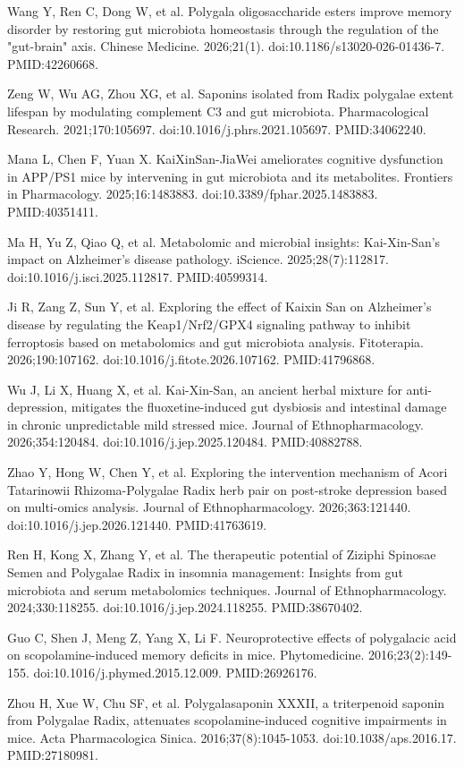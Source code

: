 \documentclass[11pt,oneside]{book}
\newcommand{\reff}[2]{\par\hangindent=7mm\hangafter=1\noindent[#1]\hspace{2mm}#2\par}
\begin{document}
\reff{22}{Wang Y, Ren C, Dong W, et al. Polygala oligosaccharide esters improve memory disorder by restoring gut microbiota homeostasis through the regulation of the "gut-brain" axis. Chinese Medicine. 2026;21(1). doi:10.1186/s13020-026-01436-7. PMID:42260668.}
\reff{23}{Zeng W, Wu AG, Zhou XG, et al. Saponins isolated from Radix polygalae extent lifespan by modulating complement C3 and gut microbiota. Pharmacological Research. 2021;170:105697. doi:10.1016/j.phrs.2021.105697. PMID:34062240.}
\reff{24}{Mana L, Chen F, Yuan X. KaiXinSan-JiaWei ameliorates cognitive dysfunction in APP/PS1 mice by intervening in gut microbiota and its metabolites. Frontiers in Pharmacology. 2025;16:1483883. doi:10.3389/fphar.2025.1483883. PMID:40351411.}
\reff{25}{Ma H, Yu Z, Qiao Q, et al. Metabolomic and microbial insights: Kai-Xin-San's impact on Alzheimer's disease pathology. iScience. 2025;28(7):112817. doi:10.1016/j.isci.2025.112817. PMID:40599314.}
\reff{26}{Ji R, Zang Z, Sun Y, et al. Exploring the effect of Kaixin San on Alzheimer's disease by regulating the Keap1/Nrf2/GPX4 signaling pathway to inhibit ferroptosis based on metabolomics and gut microbiota analysis. Fitoterapia. 2026;190:107162. doi:10.1016/j.fitote.2026.107162. PMID:41796868.}
\reff{27}{Wu J, Li X, Huang X, et al. Kai-Xin-San, an ancient herbal mixture for anti-depression, mitigates the fluoxetine-induced gut dysbiosis and intestinal damage in chronic unpredictable mild stressed mice. Journal of Ethnopharmacology. 2026;354:120484. doi:10.1016/j.jep.2025.120484. PMID:40882788.}
\reff{28}{Zhao Y, Hong W, Chen Y, et al. Exploring the intervention mechanism of Acori Tatarinowii Rhizoma-Polygalae Radix herb pair on post-stroke depression based on multi-omics analysis. Journal of Ethnopharmacology. 2026;363:121440. doi:10.1016/j.jep.2026.121440. PMID:41763619.}
\reff{29}{Ren H, Kong X, Zhang Y, et al. The therapeutic potential of Ziziphi Spinosae Semen and Polygalae Radix in insomnia management: Insights from gut microbiota and serum metabolomics techniques. Journal of Ethnopharmacology. 2024;330:118255. doi:10.1016/j.jep.2024.118255. PMID:38670402.}
\reff{30}{Guo C, Shen J, Meng Z, Yang X, Li F. Neuroprotective effects of polygalacic acid on scopolamine-induced memory deficits in mice. Phytomedicine. 2016;23(2):149-155. doi:10.1016/j.phymed.2015.12.009. PMID:26926176.}
\reff{31}{Zhou H, Xue W, Chu SF, et al. Polygalasaponin XXXII, a triterpenoid saponin from Polygalae Radix, attenuates scopolamine-induced cognitive impairments in mice. Acta Pharmacologica Sinica. 2016;37(8):1045-1053. doi:10.1038/aps.2016.17. PMID:27180981.}
\end{document}
